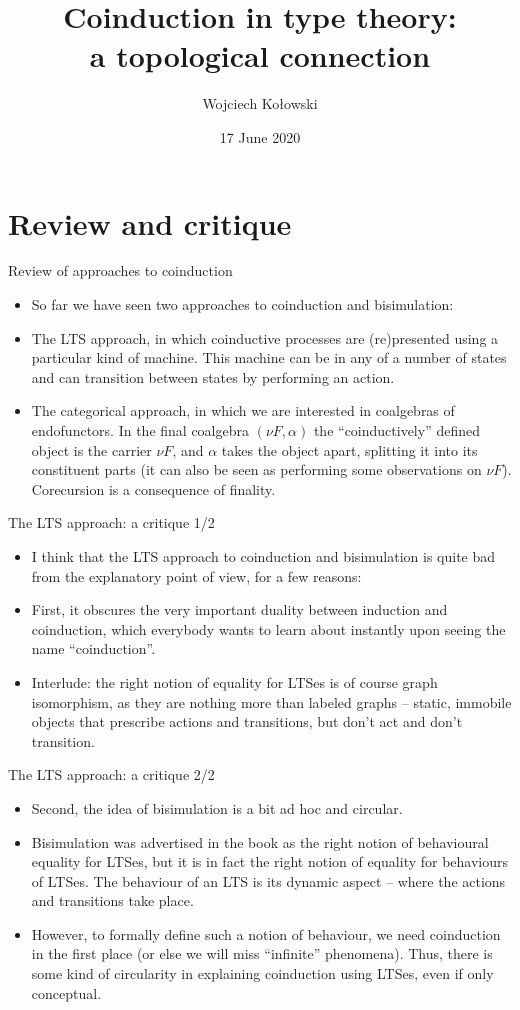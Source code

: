 \documentclass{beamer}
\title{Coinduction in type theory:\\a topological connection}
\author{Wojciech Kołowski}
\date{17 June 2020}
\begin{document}
\frame{\titlepage}
\frame{\tableofcontents}

\section{Review and critique}

\begin{frame}{Review of approaches to coinduction}
\begin{itemize}
	\item So far we have seen two approaches to coinduction and bisimulation:
	\item The LTS approach, in which coinductive processes are (re)presented using a particular kind of machine. This machine can be in any of a number of states and can transition between states by performing an action.
	\item The categorical approach, in which we are interested in coalgebras of endofunctors. In the final coalgebra $(\nu F, \alpha)$ the ``coinductively'' defined object is the carrier $\nu F$, and $\alpha$ takes the object apart, splitting it into its constituent parts (it can also be seen as performing some observations on $\nu F$). Corecursion is a consequence of finality.
\end{itemize}
\end{frame}

\begin{frame}{The LTS approach: a critique 1/2}
\begin{itemize}
	\item I think that the LTS approach to coinduction and bisimulation is quite bad from the explanatory point of view, for a few reasons:
	\item First, it obscures the very important duality between induction and coinduction, which everybody wants to learn about instantly upon seeing the name ``coinduction''.
	\item Interlude: the right notion of equality for LTSes is of course graph isomorphism, as they are nothing more than labeled graphs -- static, immobile objects that prescribe actions and transitions, but don't act and don't transition.
\end{itemize}
\end{frame}

\begin{frame}{The LTS approach: a critique 2/2}
\begin{itemize}
	\item Second, the idea of bisimulation is a bit ad hoc and circular.
	\item Bisimulation was advertised in the book as the right notion of behavioural equality for LTSes, but it is in fact the right notion of equality for behaviours of LTSes. The behaviour of an LTS is its dynamic aspect -- where the actions and transitions take place.
	\item However, to formally define such a notion of behaviour, we need coinduction in the first place (or else we will miss ``infinite'' phenomena). Thus, there is some kind of circularity in explaining coinduction using LTSes, even if only conceptual.
\end{itemize}
\end{frame}
\end{document}
